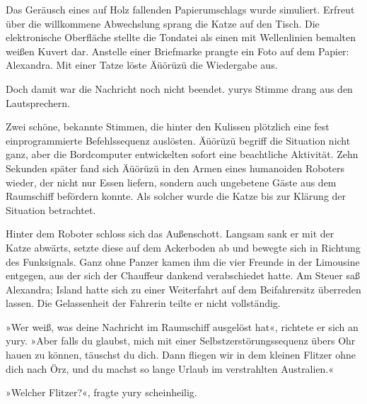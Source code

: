 
Das Geräusch eines auf Holz fallenden Papierumschlags wurde simuliert. Erfreut über die willkommene Abwechslung sprang die Katze auf den Tisch. Die elektronische Oberfläche stellte die Tondatei als einen mit Wellenlinien bemalten weißen Kuvert dar. Anstelle einer Briefmarke prangte ein Foto auf dem Papier: Alexandra. Mit einer Tatze löste Äüörüzü die Wiedergabe aus.


Doch damit war die Nachricht noch nicht beendet. yurys Stimme drang aus den Lautsprechern.


Zwei schöne, bekannte Stimmen, die hinter den Kulissen plötzlich eine fest einprogrammierte Befehlssequenz auslösten. Äüörüzü begriff die Situation nicht ganz, aber die Bordcomputer entwickelten sofort eine beachtliche Aktivität. Zehn Sekunden später fand sich Äüörüzü in den Armen eines humanoiden Roboters wieder, der nicht nur Essen liefern, sondern auch ungebetene Gäste aus dem Raumschiff befördern konnte. Als solcher wurde die Katze bis zur Klärung der Situation betrachtet.

Hinter dem Roboter schloss sich das Außenschott. Langsam sank er mit der Katze abwärts, setzte diese auf dem Ackerboden ab und bewegte sich in Richtung des Funksignals. Ganz ohne Panzer kamen ihm die vier Freunde in der Limousine entgegen, aus der sich der Chauffeur dankend verabschiedet hatte. Am Steuer saß Alexandra; Island hatte sich zu einer Weiterfahrt auf dem Beifahrersitz überreden lassen. Die Gelassenheit der Fahrerin teilte er nicht vollständig.

»Wer weiß, was deine Nachricht im Raumschiff ausgelöst hat«, richtete er sich an yury. »Aber falls du glaubst, mich mit einer Selbstzerstörungssequenz übers Ohr hauen zu können, täuschst du dich. Dann fliegen wir in dem kleinen Flitzer ohne dich nach Örz, und du machst so lange Urlaub im verstrahlten Australien.«

»Welcher Flitzer?«, fragte yury scheinheilig.

